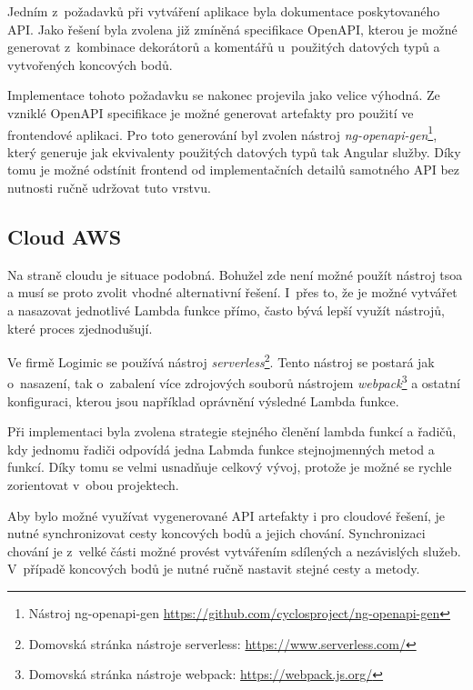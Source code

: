 Jedním z~požadavků při vytváření aplikace byla dokumentace poskytovaného API. Jako řešení byla zvolena již zmíněná specifikace OpenAPI, kterou je možné generovat z~kombinace dekorátorů a komentářů u~použitých datových typů a vytvořených koncových bodů. 

Implementace tohoto požadavku se nakonec projevila jako velice výhodná. Ze vzniklé OpenAPI specifikace je možné generovat artefakty pro použití ve frontendové aplikaci. Pro toto generování byl zvolen nástroj \textit{ng-openapi-gen}\footnote{Nástroj ng-openapi-gen \url{https://github.com/cyclosproject/ng-openapi-gen}}, který generuje jak ekvivalenty použitých datových typů tak Angular služby. Díky tomu je možné odstínit frontend od implementačních detailů samotného API bez nutnosti ručně udržovat tuto vrstvu.

\subsection{Cloud AWS}
Na straně cloudu je situace podobná. Bohužel zde není možné použít nástroj tsoa a musí se proto zvolit vhodné alternativní řešení. I~přes to, že je možné vytvářet a nasazovat jednotlivé Lambda funkce přímo, často bývá lepší využít nástrojů, které proces zjednodušují. 

Ve firmě Logimic se používá nástroj \textit{serverless}\footnote{Domovská stránka nástroje serverless: \url{https://www.serverless.com/}}. Tento nástroj se postará jak o~nasazení, tak o~zabalení více zdrojových souborů nástrojem \textit{webpack}\footnote{Domovská stránka nástroje webpack: \url{https://webpack.js.org/}} a ostatní konfiguraci, kterou jsou například oprávnění výsledné Lambda funkce.

Při implementaci byla zvolena strategie stejného členění lambda funkcí a řadičů, kdy jednomu řadiči odpovídá jedna Labmda funkce stejnojmenných metod a funkcí. Díky tomu se velmi usnadňuje celkový vývoj, protože je možné se rychle zorientovat v~obou projektech.

Aby bylo možné využívat vygenerované API artefakty i pro cloudové řešení, je nutné synchronizovat cesty koncových bodů a jejich chování. Synchronizaci chování je z~velké části možné provést vytvářením sdílených a nezávislých služeb. V~případě koncových bodů je nutné ručně nastavit stejné cesty a metody.

